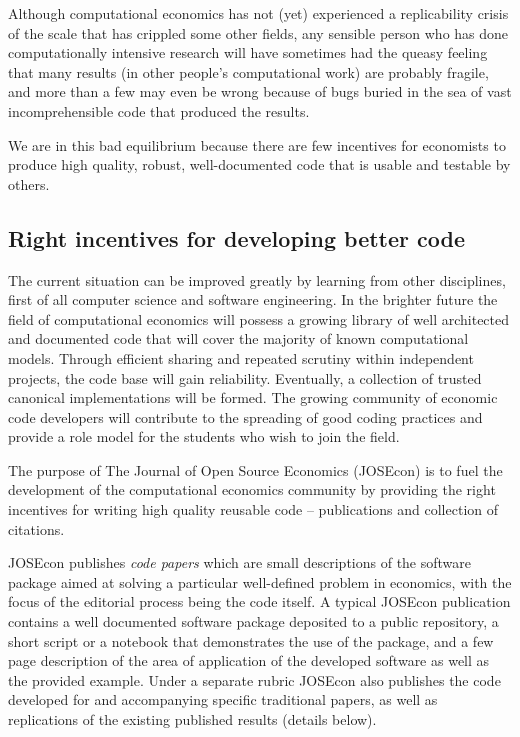 Although computational economics has not (yet) experienced a replicability
crisis of the scale that has crippled some other fields, any sensible person
who has done computationally intensive research will have sometimes had the
queasy feeling that many results (in other people's computational work) are
probably fragile, and more than a few may even be wrong because of bugs buried
in the sea of vast incomprehensible code that produced the results.

We are in this bad equilibrium because there are few incentives for economists
to produce high quality, robust, well-documented code that is usable and
testable by others.


\subsection{Right incentives for developing better code}

The current situation can be improved greatly by learning from other disciplines,
first of all computer science and software engineering.
In the brighter future the field of computational economics will possess a growing library 
of well architected and documented code that will cover the majority of known 
computational models.
Through efficient sharing and repeated scrutiny within independent projects,
the code base will gain reliability. Eventually, a collection of trusted canonical
implementations will be formed.
The growing community of economic code developers will contribute to the spreading 
of good coding practices and provide a role model for the students who wish to join the field.

The purpose of The Journal of Open Source Economics (JOSEcon) is to fuel the 
development of the computational economics community by providing the right incentives
for writing high quality reusable code -- publications and collection of citations.

JOSEcon publishes \emph{code papers} which are small descriptions of the software package
aimed at solving a particular well-defined problem in economics, with the focus
of the editorial process being the code itself.
A typical JOSEcon publication contains a well documented software package deposited to
a public repository, a short script or a notebook that demonstrates the use of the 
package, and a few page description of the area of application of the developed software
as well as the provided example.
Under a separate rubric JOSEcon also publishes the code developed for and accompanying 
specific traditional papers, as well as replications of the existing published results 
(details below).


